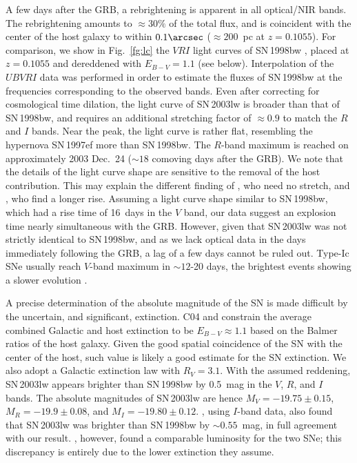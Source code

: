 \documentclass{emulateapj}
\begin{document}
A few days after the GRB, a rebrightening is apparent in all optical/NIR
bands. The rebrightening amounts to $\approx 30\%$ of the total flux,
and is coincident with the center of the host galaxy to within
$0.1\arcsec$ ($\approx 200$~pc at $z = 0.1055$). For comparison, we show
in Fig.~\ref{fg:lc} the $VRI$ light curves of SN\,1998bw
\citep{Ga98,Mc00}, placed at $z = 0.1055$ and dereddened with $E_{B-V} =
1.1$ (see below). Interpolation of the $UBVRI$ data was performed in
order to estimate the fluxes of SN\,1998bw at the frequencies
corresponding to the observed bands. Even after correcting for
cosmological time dilation, the light curve of SN\,2003lw is broader
than that of SN\,1998bw, and requires an additional stretching factor of
$\approx 0.9$ to match the $R$ and $I$ bands. Near the peak, the light
curve is rather flat, resembling the hypernova SN\,1997ef \citep{Iw00}
more than SN\,1998bw. The $R$-band maximum is reached on approximately
2003 Dec.~24 ($\sim 18$ comoving days after the GRB). We note that
the details of the light curve shape are sensitive to the removal of the
host contribution. This may explain the different finding of
\citet{Th04}, who need no stretch, and \citet{Co04}, who find a longer
rise. Assuming a light curve shape similar to SN\,1998bw, which had a
rise time of 16~days in the $V$ band, our data suggest an explosion time
nearly simultaneous with the GRB. However, given that SN\,2003lw was not
strictly identical to SN\,1998bw, and as we lack optical data in the
days immediately following the GRB, a lag of a few days cannot be ruled
out. Type-Ic SNe usually reach $V$-band maximum in $\sim 12$-20 days,
the brightest events showing a slower evolution \citep[see e.g. Fig.~2
of][]{Maz02}.

A precise determination of the absolute magnitude of the SN is made
difficult by the uncertain, and significant, extinction.  C04 and
\citet{Pr04} constrain the average combined Galactic and host extinction
to be $E_{B-V} \approx 1.1$ based on the Balmer ratios of the host
galaxy. Given the good spatial coincidence of the SN with the center of
the host, such value is likely a good estimate for the SN extinction. We
also adopt a Galactic extinction law \citep{Ca89} with $R_V = 3.1$.
With the assumed reddening, SN\,2003lw appears brighter than SN\,1998bw
by 0.5~mag in the $V$, $R$, and $I$ bands. The absolute magnitudes of
SN\,2003lw are hence $M_V = -19.75\pm0.15$, $M_R = -19.9\pm0.08$, and
$M_I = -19.80\pm0.12$. \citet{Th04}, using $I$-band data, also found
that SN\,2003lw was brighter than SN\,1998bw by $\sim 0.55$~mag, in full
agreement with our result. \citet{Co04}, however, found a comparable
luminosity for the two SNe; this discrepancy is entirely due to the
lower extinction they assume.
\end{document}
